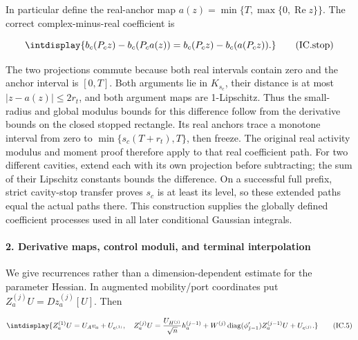 
In particular define the real-anchor map \(a(z)=\min\{T,\allowbreak \max\{0,\allowbreak \operatorname{Re}z\}\}\). The correct complex-minus-real coefficient is


\begingroup\renewcommand{\theHequation}{intdisplay.298}
\begin{equation}
\intdisplay{
b_c(P_cz)-b_c(P_ca(z))
       =b_c(P_cz)-b_c(a(P_cz)).
}
\tag{IC.stop}
\label{int:eq-0122-ic-stop}
\end{equation}
\endgroup


The two projections commute because both real intervals contain zero and the anchor interval is \([0,\allowbreak T]\). Both arguments lie in \(K_{s_c}\), their distance is at most \(|z-a(z)|\le2r_t\), and both argument maps are 1-Lipschitz. Thus the small-radius and global modulus bounds for this difference follow from the derivative bounds on the closed stopped rectangle. Its real anchors trace a monotone interval from zero to \(\min\{s_c(T+r_t),\allowbreak T\}\), then freeze. The original real activity modulus and moment proof therefore apply to that real coefficient path. For two different cavities, extend each with its own projection before subtracting; the sum of their Lipschitz constants bounds the difference. On a successful full prefix, strict cavity-stop transfer proves \(s_c\) is at least its level, so these extended paths equal the actual paths there. This construction supplies the globally defined coefficient processes used in all later conditional Gaussian integrals.


\paragraph{2. Derivative maps, control moduli, and terminal interpolation}

\mbox{}\par\smallskip


We give recurrences rather than a dimension-dependent estimate for the parameter Hessian. In augmented mobility/port coordinates put \(Z_a^{(j)}U=D z_a^{(j)}[U]\). Then


\begingroup\renewcommand{\theHequation}{intdisplay.299}
\begin{equation}
\intdisplay{
Z_a^{(1)}U=U_Av_a+U_{e^{(1)}},\quad
 Z_a^{(j)}U=\frac{U_{H^{(j)}}}{\sqrt n}h_a^{(j-1)}
       +W^{(j)}\operatorname{diag}(\phi_{j-1}')Z_a^{(j-1)}U
       +U_{e^{(j)}}.
}
\tag{IC.5}
\label{int:eq-0123-ic-5}
\end{equation}
\endgroup

